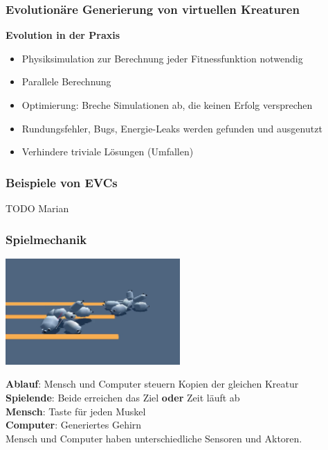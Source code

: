 \documentclass{beamer}
\begin{document}
\begin{frame}
	\frametitle{Evolutionäre Generierung von virtuellen Kreaturen}
	
	\textbf{Evolution in der Praxis}
	\begin{itemize}
		\item Physiksimulation zur Berechnung jeder Fitnessfunktion notwendig \pause
		\item Parallele Berechnung \pause
		\item Optimierung: Breche Simulationen ab, die keinen Erfolg versprechen \pause
		\item Rundungsfehler, Bugs, Energie-Leaks werden gefunden und ausgenutzt \pause
		\item Verhindere triviale Lösungen (Umfallen)
	\end{itemize}
\end{frame}


\begin{frame}
	\frametitle{Beispiele von EVCs}
	
	TODO Marian
\end{frame}


\begin{frame}
	\frametitle{Spielmechanik}
	
	\includegraphics[width=0.5\textwidth]{img/games/darwin.png}
	\vspace{1em}
	
	\textbf{Ablauf}: Mensch und Computer steuern Kopien der gleichen Kreatur \pause \\
	\vspace{1em}
	\textbf{Spielende}: Beide erreichen das Ziel \textbf{oder} Zeit läuft ab \pause \\
	\vspace{1em}
	\textbf{Mensch}: Taste für jeden Muskel \\
	\textbf{Computer}: Generiertes Gehirn \pause \\
	\vspace{1em}
	Mensch und Computer haben unterschiedliche Sensoren und Aktoren.
\end{frame}
\end{document}
